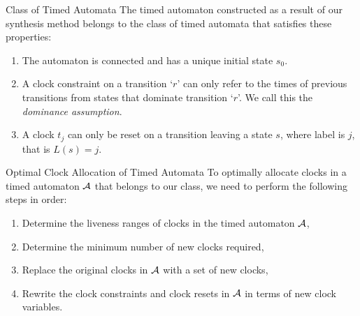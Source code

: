 \documentclass[10pt]{beamer}
\theoremstyle{plain}
\theoremstyle{definition}
\begin{document}
\begin{frame}{Class of Timed Automata}
The timed automaton constructed as a result of our synthesis method belongs to the class of timed automata that satisfies these properties:
	\begin{enumerate}
		\item{The automaton is connected and has a unique initial state $s_0$.}%
		\item{A clock constraint on a transition `$r$' can only refer to the times of previous transitions from states that dominate transition `$r$'. We call this the \textit{dominance assumption}.}
		\item{A clock $t_j$ can only be reset on a transition leaving a state $s$, where label is $j$, that is $L(s)=j$.}
	\end{enumerate}
\end{frame}

\begin{frame}{Optimal Clock Allocation of Timed Automata}
	To optimally allocate clocks in a timed automaton $\cal A$ that belongs to our class, we need to perform the following steps in order:
	\begin{enumerate}
		\item{Determine the liveness ranges of clocks in the timed automaton $\cal A$,}
		\item{Determine the minimum number of new clocks required,}
		\item{Replace the original clocks in $\cal A$ with a set of new clocks,} %
		\item{Rewrite the clock constraints and clock resets in $\cal A$ in terms of new clock variables.}
	\end{enumerate}

\end{frame}
\end{document}
